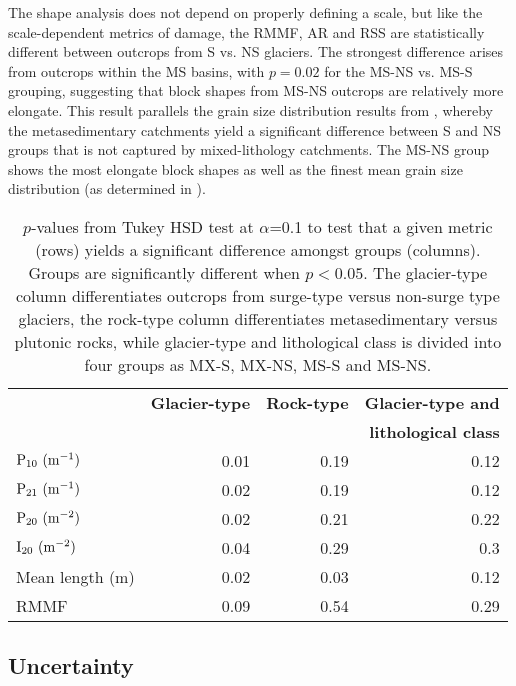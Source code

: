 \documentclass[review]{igs}
\begin{document}
The shape analysis does not depend on properly defining a scale, but like the scale-dependent metrics of damage, the RMMF, AR and RSS are statistically different between outcrops from S vs. NS glaciers. The strongest difference arises from outcrops within the MS basins, with $p=0.02$ for the MS-NS vs. MS-S grouping, suggesting that block shapes from MS-NS outcrops are relatively more elongate. This result parallels the grain size distribution results from \cite{Crompton2016}, whereby the metasedimentary catchments yield a significant difference between S and NS groups that is not captured by mixed-lithology catchments. The MS-NS group shows the most elongate block shapes as well as the finest mean grain size distribution (as determined in \cite{Crompton2016}). 

\begin{table}[H]
\begin{tabular}{lrrr}

\hline
&\textbf{Glacier-type} & \textbf{Rock-type} & \textbf{Glacier-type and} \\
& & & \textbf{lithological class}\\
\hline
$\rm{P_{10}\,\,(m^{-1})}$ & 0.01 & 0.19 & 0.12 \\
$\rm{P_{21}\,\, (m^{-1})}$ & 0.02& 0.19 & 0.12 \\
$\rm{P_{20}\,\, (m^{-2})}$ &0.02 & 0.21 & 0.22 \\
$\rm{I_{20} \,\,(m^{-2})}$ & 0.04&0.29 & 0.3 \\
Mean length (m)& 0.02 &0.03 & 0.12 \\
RMMF & 0.09 & 0.54& 0.29 \\
\hline

\end{tabular}
\caption{$p$-values from Tukey HSD test at $\alpha$=0.1 to test that a given metric (rows) yields a significant difference amongst groups (columns). Groups are significantly different when $p<0.05$. The glacier-type column differentiates outcrops from surge-type versus non-surge type glaciers, the rock-type column differentiates metasedimentary versus plutonic rocks, while glacier-type and lithological class is divided into four groups as MX-S, MX-NS, MS-S and MS-NS.}
\label{tab2}
\end{table}

\subsection{Uncertainty}
\end{document}
